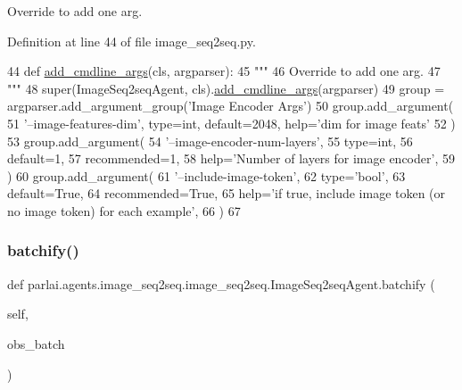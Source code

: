\begin{DoxyVerb}Override to add one arg.
\end{DoxyVerb}
 

Definition at line 44 of file image\+\_\+seq2seq.\+py.


\begin{DoxyCode}
44     \textcolor{keyword}{def }\hyperlink{namespaceparlai_1_1agents_1_1drqa_1_1config_a62fdd5554f1da6be0cba185271058320}{add\_cmdline\_args}(cls, argparser):
45         \textcolor{stringliteral}{"""}
46 \textcolor{stringliteral}{        Override to add one arg.}
47 \textcolor{stringliteral}{        """}
48         super(ImageSeq2seqAgent, cls).\hyperlink{namespaceparlai_1_1agents_1_1drqa_1_1config_a62fdd5554f1da6be0cba185271058320}{add\_cmdline\_args}(argparser)
49         group = argparser.add\_argument\_group(\textcolor{stringliteral}{'Image Encoder Args'})
50         group.add\_argument(
51             \textcolor{stringliteral}{'--image-features-dim'}, type=int, default=2048, help=\textcolor{stringliteral}{'dim for image feats'}
52         )
53         group.add\_argument(
54             \textcolor{stringliteral}{'--image-encoder-num-layers'},
55             type=int,
56             default=1,
57             recommended=1,
58             help=\textcolor{stringliteral}{'Number of layers for image encoder'},
59         )
60         group.add\_argument(
61             \textcolor{stringliteral}{'--include-image-token'},
62             type=\textcolor{stringliteral}{'bool'},
63             default=\textcolor{keyword}{True},
64             recommended=\textcolor{keyword}{True},
65             help=\textcolor{stringliteral}{'if true, include image token (or no image token) for each example'},
66         )
67 
\end{DoxyCode}
\mbox{\label{classparlai_1_1agents_1_1image__seq2seq_1_1image__seq2seq_1_1ImageSeq2seqAgent_a7dc7e180dd0c0ca30f1ab04e0b54c481}} 
\subsubsection{\texorpdfstring{batchify()}{batchify()}}
{\footnotesize\ttfamily def parlai.\+agents.\+image\+\_\+seq2seq.\+image\+\_\+seq2seq.\+Image\+Seq2seq\+Agent.\+batchify (\begin{DoxyParamCaption}\item[{}]{self,  }\item[{}]{obs\+\_\+batch }\end{DoxyParamCaption})}



